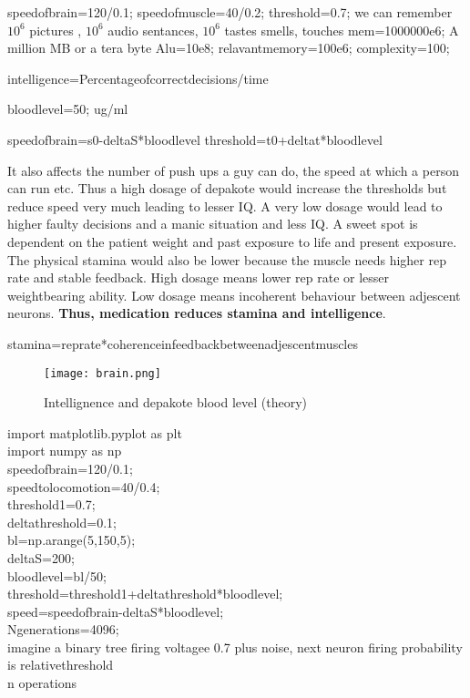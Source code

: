 \documentclass[a4paper]{article}
\begin{document}
speedofbrain=120/0.1;
speedofmuscle=40/0.2;
threshold=0.7;
we can remember $10^6$ pictures , $10^6$ audio sentances, $10^6$ tastes smells, touches
mem=1000000e6;  A million MB or a tera byte
Alu=10e8;
relavantmemory=100e6;
complexity=100;

intelligence=Percentageofcorrectdecisions/time

bloodlevel=50; ug/ml

speedofbrain=s0-deltaS*bloodlevel
threshold=t0+deltat*bloodlevel

It also affects the number of push ups a guy can do, the speed at which  a person can run etc. Thus a high dosage of depakote would increase the thresholds but reduce speed very much leading to lesser IQ. A very low dosage would lead to higher faulty decisions and a manic situation and less IQ. A sweet spot is dependent on the patient weight and past exposure to life and present exposure. The physical stamina would also be lower because the muscle needs higher rep rate and stable feedback. High dosage means lower rep rate or lesser weightbearing ability. Low dosage means incoherent behaviour between adjescent neurons. \textbf{Thus, medication reduces stamina and intelligence}.

stamina=reprate*coherenceinfeedbackbetweenadjescentmuscles

 

\begin{figure}
\centering
\texttt{[image: brain.png]}
\caption{\label{fig:Lorenz}Intellignence and depakote blood level (theory)}
\end{figure}

import matplotlib.pyplot as plt\\
import numpy as np\\
speedofbrain=120/0.1;\\
speedtolocomotion=40/0.4;\\
threshold1=0.7;\\
deltathreshold=0.1;\\
bl=np.arange(5,150,5);\\
deltaS=200;\\
bloodlevel=bl/50;\\
threshold=threshold1+deltathreshold*bloodlevel;\\
speed=speedofbrain-deltaS*bloodlevel;\\
Ngenerations=4096;\\

imagine a binary tree firing voltagee 0.7 plus noise, next neuron firing probability is relativethreshold\\
n operations\\
\end{document}
